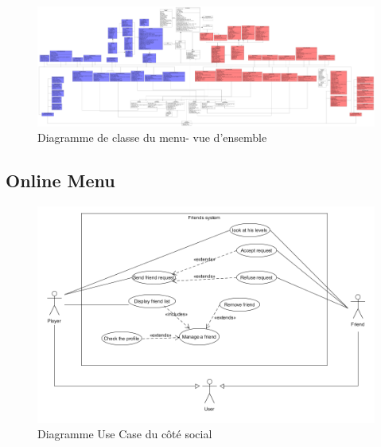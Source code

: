 \documentclass[french]{article}
\begin{document}
\begin{figure}[!htbp] %
    \centering
    \includegraphics[scale=0.09, angle=90,origin=c]{class_diagram/class_diagram_menu.png}
    \caption{Diagramme de classe du menu- vue d'ensemble}
    \label{class diagram:main menu}
\end{figure}
\restoregeometry
\begin{flushleft}
\subsection{Online Menu}
\end{flushleft}
\begin{figure}[!htbp]
    \centering
    \includegraphics[scale=0.5]{use_case/Friends_System_use_case.png}
    \caption{Diagramme Use Case du côté social}
    \label{use case:online menu}
\end{figure}
\end{document}
